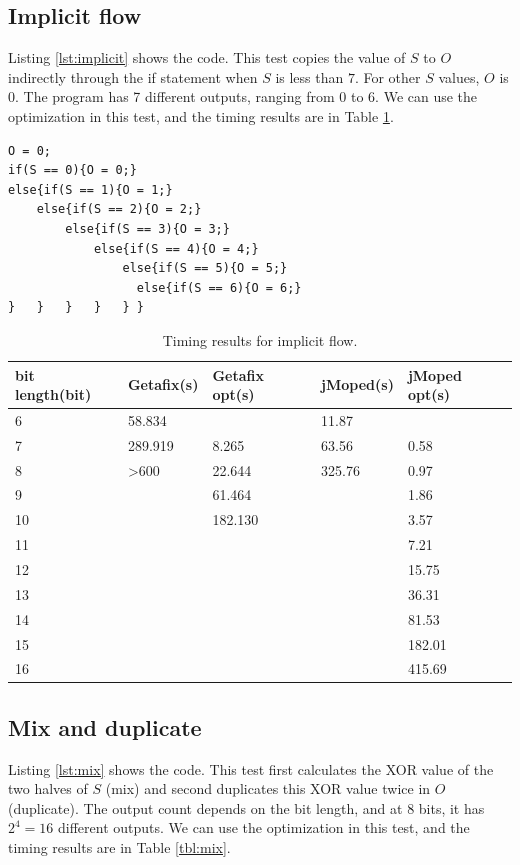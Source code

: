 \subsection{Implicit flow}
Listing \ref{lst:implicit} shows the code. This test copies the value of $S$ to $O$ indirectly through the if statement when $S$ is less than $7$. For other $S$ values, $O$ is $0$. The program has 7 different outputs, ranging from $0$ to $6$. We can use the optimization in this test, and the timing results are in Table \ref{tbl:implicit}.

\lstset{language=C}  
\begin{lstlisting}[float=!h, caption={Implict flow test program.},label=lst:implicit]
O = 0;
if(S == 0){O = 0;}
else{if(S == 1){O = 1;}
	else{if(S == 2){O = 2;}
		else{if(S == 3){O = 3;}
			else{if(S == 4){O = 4;}
				else{if(S == 5){O = 5;}
				  else{if(S == 6){O = 6;}
}	}	}	} 	} }
\end{lstlisting}

\begin{table}[!h]
\begin{center}
\begin{tabular}{|l|l|l|l|l|}
\hline
bit length(bit) & Getafix(s) & Getafix opt(s) & jMoped(s) & jMoped opt(s) \\ \hline
6 & 58.834 &  & 11.87 &  \\ \hline
7 & 289.919 & 8.265 & 63.56 & 0.58 \\ \hline
8 & \textgreater600 & 22.644 & 325.76 & 0.97 \\ \hline
9 &  & 61.464 &  & 1.86 \\ \hline
10 &  & 182.130 &  & 3.57 \\ \hline
11 &  &  &  & 7.21 \\ \hline
12 &  &  &  & 15.75 \\ \hline
13 &  &  &  & 36.31 \\ \hline
14 &  &  &  & 81.53 \\ \hline
15 &  &  &  & 182.01 \\ \hline
16 &  &  &  & 415.69 \\ \hline
\end{tabular}
\end{center}
\caption{Timing results for implicit flow.}
\label{tbl:implicit}
\end{table}

\subsection{Mix and duplicate}
Listing \ref{lst:mix} shows the code. This test first calculates the XOR value of the two halves of $S$ (mix) and second duplicates this XOR value twice in $O$ (duplicate). The output count depends on the bit length, and at $8$ bits, it has $2^{4} = 16$ different outputs. We can use the optimization in this test, and the timing results are in Table \ref{tbl:mix}.


